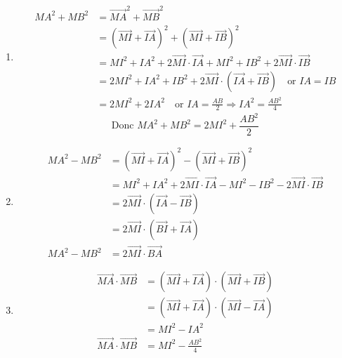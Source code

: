 \documentclass[12pt,a4paper]{article}
\begin{document}
\begin{enumerate}
    \item 
    \begin{align*}
        MA^2 + MB^2 &= \overrightarrow{MA}^2 + \overrightarrow{MB}^2 \\
        &= (\overrightarrow{MI} + \overrightarrow{IA})^2 + (\overrightarrow{MI} + \overrightarrow{IB})^2 \\
        &= MI^2 + IA^2 + 2\overrightarrow{MI} \cdot \overrightarrow{IA} + MI^2 + IB^2 + 2\overrightarrow{MI} \cdot \overrightarrow{IB} \\
        &= 2MI^2 + IA^2 + IB^2 + 2\overrightarrow{MI} \cdot (\overrightarrow{IA} + \overrightarrow{IB}) \quad \text{or } IA = IB \\
        &= 2MI^2 + 2IA^2 \quad \text{or } IA = \frac{AB}{2} \Rightarrow IA^2 = \frac{AB^2}{4}
    \end{align*}
    \[
\text{Donc } MA^2 + MB^2 = 2MI^2 + \frac{AB^2}{2}
\]

    \item 
    \begin{align*}
        MA^2 - MB^2 &= (\overrightarrow{MI} + \overrightarrow{IA})^2 - (\overrightarrow{MI} + \overrightarrow{IB})^2 \\
        &= MI^2 + IA^2 + 2\overrightarrow{MI} \cdot \overrightarrow{IA} - MI^2 - IB^2 - 2\overrightarrow{MI} \cdot \overrightarrow{IB} \\
        &= 2\overrightarrow{MI} \cdot (\overrightarrow{IA} - \overrightarrow{IB}) \\
        &= 2\overrightarrow{MI} \cdot (\overrightarrow{BI} + \overrightarrow{IA}) \\
        MA^2 - MB^2 &= 2\overrightarrow{MI} \cdot \overrightarrow{BA}
    \end{align*}

    \item 
    \begin{align*}
        \overrightarrow{MA} \cdot \overrightarrow{MB} &= (\overrightarrow{MI} + \overrightarrow{IA}) \cdot (\overrightarrow{MI} + \overrightarrow{IB}) \\
        &= (\overrightarrow{MI} + \overrightarrow{IA}) \cdot (\overrightarrow{MI} - \overrightarrow{IA}) \\
        &= MI^2 - IA^2 \\
        \overrightarrow{MA} \cdot \overrightarrow{MB} &= MI^2 - \frac{AB^2}{4}
    \end{align*}
\end{enumerate}
\end{document}
